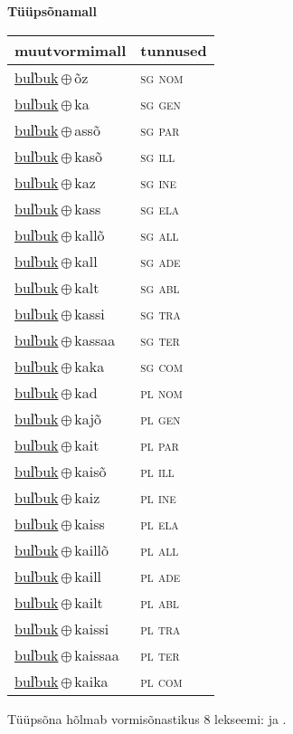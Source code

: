 

\vspace{3.5em}
\noindent \begin{minipage}{\textwidth}
\noindent \textbf{Tüüpsõnamall \,}\\

\begin{sideways}
\begin{tabular}{l l}
muutvormimall & tunnused \\
\hline
\underline{bul̕buk}\,$\oplus$\,õz & \textsc{ sg nom } \\
\underline{bul̕buk}\,$\oplus$\,ka & \textsc{ sg gen } \\
\underline{bul̕buk}\,$\oplus$\,assõ & \textsc{ sg par } \\
\underline{bul̕buk}\,$\oplus$\,kasõ & \textsc{ sg ill } \\
\underline{bul̕buk}\,$\oplus$\,kaz & \textsc{ sg ine } \\
\underline{bul̕buk}\,$\oplus$\,kass & \textsc{ sg ela } \\
\underline{bul̕buk}\,$\oplus$\,kallõ & \textsc{ sg all } \\
\underline{bul̕buk}\,$\oplus$\,kall & \textsc{ sg ade } \\
\underline{bul̕buk}\,$\oplus$\,kalt & \textsc{ sg abl } \\
\underline{bul̕buk}\,$\oplus$\,kassi & \textsc{ sg tra } \\
\underline{bul̕buk}\,$\oplus$\,kassaa & \textsc{ sg ter } \\
\underline{bul̕buk}\,$\oplus$\,kaka & \textsc{ sg com } \\
\underline{bul̕buk}\,$\oplus$\,kad & \textsc{ pl nom } \\
\underline{bul̕buk}\,$\oplus$\,kajõ & \textsc{ pl gen } \\
\underline{bul̕buk}\,$\oplus$\,kait & \textsc{ pl par } \\
\underline{bul̕buk}\,$\oplus$\,kaisõ & \textsc{ pl ill } \\
\underline{bul̕buk}\,$\oplus$\,kaiz & \textsc{ pl ine } \\
\underline{bul̕buk}\,$\oplus$\,kaiss & \textsc{ pl ela } \\
\underline{bul̕buk}\,$\oplus$\,kaillõ & \textsc{ pl all } \\
\underline{bul̕buk}\,$\oplus$\,kaill & \textsc{ pl ade } \\
\underline{bul̕buk}\,$\oplus$\,kailt & \textsc{ pl abl } \\
\underline{bul̕buk}\,$\oplus$\,kaissi & \textsc{ pl tra } \\
\underline{bul̕buk}\,$\oplus$\,kaissaa & \textsc{ pl ter } \\
\underline{bul̕buk}\,$\oplus$\,kaika & \textsc{ pl com } \\
\end{tabular}
\end{sideways}
\label{tab:tüüpsõnamall-bul̕bukõz}

\end{minipage}

 
\vspace{1em}
\noindent Tüüpsõna hõlmab vormisõnastikus 8 lekseemi:  ja .
